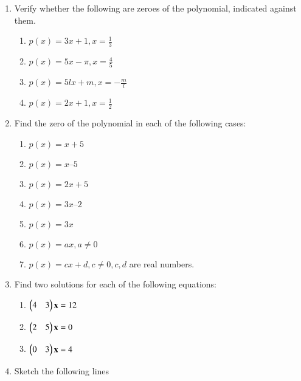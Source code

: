 \renewcommand{\theequation}{\theenumi}
\begin{enumerate}[label=\arabic*.,ref=\thesubsection.\theenumi]
%
 \item Verify whether the following are zeroes of the polynomial, indicated against them. 
\begin{enumerate}
\item $ p(x) = 3x + 1, x = \frac{1}{3}$
\item $ p(x) = 5x -\pi, x = \frac{4}{5}$
\item $ p(x) = 5lx+m, x = -\frac{m}{l}$
\item $ p(x) = 2x+1, x = \frac{1}{2}$
\end{enumerate}
%
\solution 

%
\item Find the zero of the polynomial in each of the following cases: 
\begin{enumerate}
\item $p(x) = x + 5 $
\item $p(x) = x – 5$
\item $p(x) = 2x + 5$
\item $p(x) = 3x – 2$
 \item $p(x) = 3x$
 \item $p(x) = ax, a \ne 0$
\item $p(x) = cx + d, c \ne 0, c, d$ are real numbers.
\end{enumerate}
\item Find two solutions for each of the following equations: 
\begin{enumerate}
\item $\begin{pmatrix}4 & 3\end{pmatrix}\mathbf{x} = 12$
\item $\begin{pmatrix} 2 & 5\end{pmatrix}\mathbf{x}  = 0 $
\item $\begin{pmatrix} 0 & 3\end{pmatrix}\mathbf{x}  = 4$
\end{enumerate}
\item Sketch the following lines
%
\begin{enumerate}[itemsep=2pt]
\end{enumerate}
\end{enumerate}
